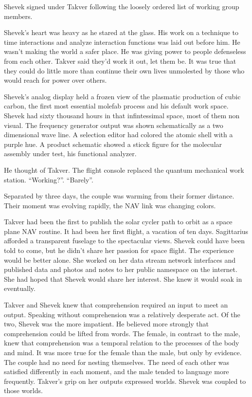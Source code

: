 Shevek signed under Takver following the loosely ordered list of
working group members.

Shevek's heart was heavy as he stared at the glass.  His work on a
technique to time interactions and analyze interaction functions was
laid out before him.  He wasn't making the world a safer place.  He
was giving power to people defenseless from each other.  Takver said
they'd work it out, let them be.  It was true that they could do
little more than continue their own lives unmolested by those who
would reach for power over others.

Shevek's analog display held a frozen view of the plasmatic production
of cubic carbon, the first most essential molefab process and his
default work space.  Shevek had sixty thousand hours in that
infintessimal space, most of them non visual.  The frequency generator
output was shown schematically as a two dimensional wave line.  A
selection editor had colored the atomic shell with a purple hue.  A
product schematic showed a sticck figure for the molecular assembly
under test, his functional analyzer.

He thought of Takver.  The flight console replaced the quantum
mechanical work station.  ``Working?''.  ``Barely''.

Separated by three days, the couple was warming from their former
distance.  Their moment was evolving rapidly, the NAV link was
changing colors.

Takver had been the first to publish the solar cycler path to orbit as
a space plane NAV routine.  It had been her first flight, a vacation
of ten days.  Sagittarius afforded a transparent fuselage to the
spectacular views.  Shevek could have been told to come, but he didn't
share her passion for space flight.  The experience would be better
alone.  She worked on her data stream network interfaces and published
data and photos and notes to her public namespace on the internet.
She had hoped that Shevek would share her interest.  She knew it would
soak in eventually.

Takver and Shevek knew that comprehension required an input to meet an
output.  Speaking without comprehension was a relatively desperate
act.  Of the two, Shevek was the more impatient.  He believed more
strongly that comprehension could be lifted from words.  The female,
in contrast to the male, knew that comprehension was a temporal
relation to the processes of the body and mind.  It was more true for
the female than the male, but only by evidence.  The couple had no
need for nesting themselves.  The need of each other was satisfied
differently in each moment, and the male tended to language more
frequently.  Takver's grip on her outputs expressed worlds.  Shevek
was coupled to those worlds.

